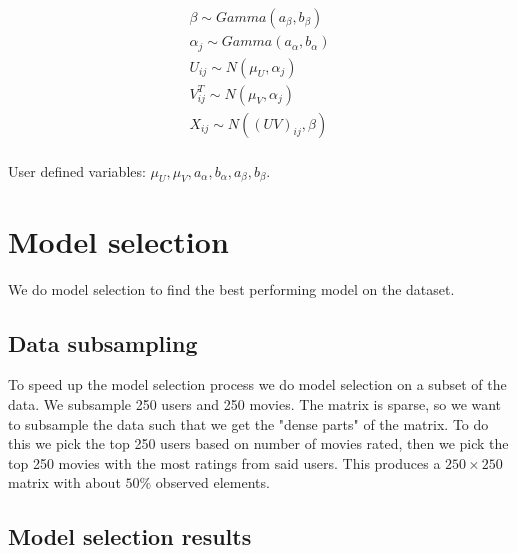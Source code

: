 \documentclass[12pt]{article}
\begin{document}
    \begin{align*}
        \beta \sim Gamma(a_\beta, b_\beta) \\
        \alpha_{j} \sim Gamma(a_\alpha, b_\alpha) \\
        U_{ij} \sim N(\mu_U, \alpha_j) \\
        V^T_{ij} \sim N(\mu_V, \alpha_j) \\
        X_{ij}\sim N((UV)_{ij}, \beta) \\
    \end{align*}

    User defined variables: $\mu_U, \mu_V, a_\alpha, b_\alpha, a_\beta, b_\beta$.

\section{Model selection}
We do model selection to find the best performing model on the dataset. 

    \subsection{Data subsampling}
    To speed up the model selection process we do model selection on a subset of the data. We subsample 250 users and 250 movies. The matrix is sparse, so we want to subsample the data such that we get the "dense parts" of the matrix. To do this we pick the top 250 users based on number of movies rated, then we pick the top 250 movies with the most ratings from said users. This produces a $250 \times 250$ matrix with about $50\%$ observed elements.

    \subsection{Model selection results}
    

% 


\end{document}
